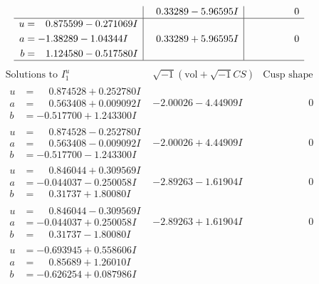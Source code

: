 \documentclass[1p]{elsarticle_modified}
\theoremstyle{definition}
\newcommand{\I}{\sqrt{-1}}
\begin{document}
$$\begin{array}{c|c|c}
 & \phantom{-}0.33289 - 5.96595 I & \phantom{-0.000000 } 0 \\ \hline\begin{aligned}
u &= \phantom{-}0.875599 - 0.271069 I \\
a &= -1.38289 - 1.04344 I \\
b &= \phantom{-}1.124580 - 0.517580 I\end{aligned}
 & \phantom{-}0.33289 + 5.96595 I & \phantom{-0.000000 } 0\\
 \hline 
 \end{array}$$\newpage$$\begin{array}{c|c|c}  
\text{Solutions to }I^u_{1}& \I (\text{vol} + \sqrt{-1}CS) & \text{Cusp shape}\\
 \hline 
\begin{aligned}
u &= \phantom{-}0.874528 + 0.252780 I \\
a &= \phantom{-}0.563408 + 0.009092 I \\
b &= -0.517700 + 1.243300 I\end{aligned}
 & -2.00026 - 4.44909 I & \phantom{-0.000000 } 0 \\ \hline\begin{aligned}
u &= \phantom{-}0.874528 - 0.252780 I \\
a &= \phantom{-}0.563408 - 0.009092 I \\
b &= -0.517700 - 1.243300 I\end{aligned}
 & -2.00026 + 4.44909 I & \phantom{-0.000000 } 0 \\ \hline\begin{aligned}
u &= \phantom{-}0.846044 + 0.309569 I \\
a &= -0.044037 - 0.250058 I \\
b &= \phantom{-}0.31737 + 1.80080 I\end{aligned}
 & -2.89263 - 1.61904 I & \phantom{-0.000000 } 0 \\ \hline\begin{aligned}
u &= \phantom{-}0.846044 - 0.309569 I \\
a &= -0.044037 + 0.250058 I \\
b &= \phantom{-}0.31737 - 1.80080 I\end{aligned}
 & -2.89263 + 1.61904 I & \phantom{-0.000000 } 0 \\ \hline\begin{aligned}
u &= -0.693945 + 0.558606 I \\
a &= \phantom{-}0.85689 + 1.26010 I \\
b &= -0.626254 + 0.087986 I\end{aligned}

\end{array}$$
\end{document}
